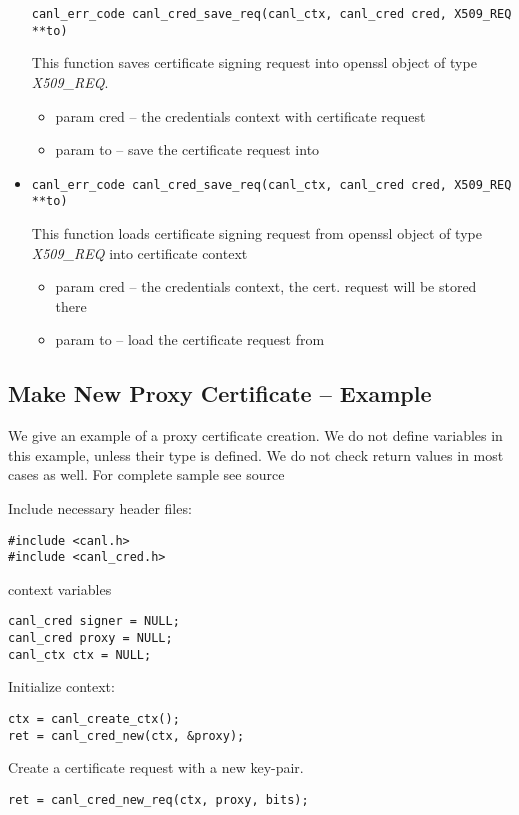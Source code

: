 \begin{itemize}
\begin{verbatim}
canl_err_code canl_cred_save_req(canl_ctx, canl_cred cred, X509_REQ **to)\end{verbatim}
  This function saves certificate signing request into openssl 
  object of type \textit{X509\_REQ}.
  \begin{itemize}
    \item param cred -- the credentials context with certificate request
    \item param to -- save the certificate request into
  \end{itemize}
  \item \begin{verbatim}
canl_err_code canl_cred_save_req(canl_ctx, canl_cred cred, X509_REQ **to)\end{verbatim}
  This function loads certificate signing request from openssl object of type \textit{X509\_REQ} into \CANL certificate context
  \begin{itemize}
    \item param cred -- the credentials context, the cert. request
  will be stored there
    \item param to -- load the certificate request from
  \end{itemize}

\end{itemize}

\subsection{Make New Proxy Certificate -- Example}
We give an example of a proxy certificate creation. We do not 
define variables in this example, unless
their type is \CANL defined. We do not check return values in most
cases as well.
For complete sample see \TODO source

Include necessary header files:
\begin{lstlisting}
#include <canl.h>
#include <canl_cred.h>
\end{lstlisting}
\CANL context variables
\begin{lstlisting}
canl_cred signer = NULL;
canl_cred proxy = NULL;
canl_ctx ctx = NULL;
\end{lstlisting}

Initialize context:
\begin{lstlisting}
ctx = canl_create_ctx();
ret = canl_cred_new(ctx, &proxy);
\end{lstlisting}

Create a certificate request with a new key-pair.
\begin{lstlisting}
ret = canl_cred_new_req(ctx, proxy, bits);
\end{lstlisting}

